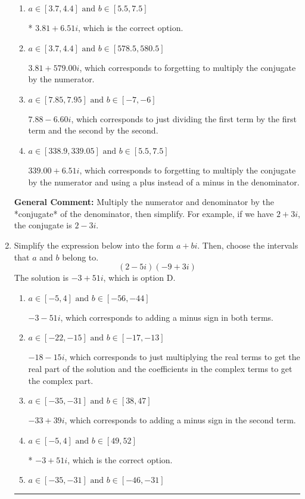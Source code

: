 \documentclass{extbook}[14pt]
\newcommand{\litem}[1]{\item #1

\rule{\textwidth}{0.4pt}}
\begin{document}
\begin{enumerate}
{\begin{enumerate}[label=\Alph*.]
 $7.52  - 0.57 i$, which corresponds to forgetting to multiply the conjugate by the numerator and not computing the conjugate correctly.
\item \( a \in [3.7, 4.4] \text{ and } b \in [5.5, 7.5] \)

* $3.81  + 6.51 i$, which is the correct option.
\item \( a \in [3.7, 4.4] \text{ and } b \in [578.5, 580.5] \)

 $3.81  + 579.00 i$, which corresponds to forgetting to multiply the conjugate by the numerator.
\item \( a \in [7.85, 7.95] \text{ and } b \in [-7, -6] \)

 $7.88  - 6.60 i$, which corresponds to just dividing the first term by the first term and the second by the second.
\item \( a \in [338.9, 339.05] \text{ and } b \in [5.5, 7.5] \)

 $339.00  + 6.51 i$, which corresponds to forgetting to multiply the conjugate by the numerator and using a plus instead of a minus in the denominator.
\end{enumerate}

\textbf{General Comment:} Multiply the numerator and denominator by the *conjugate* of the denominator, then simplify. For example, if we have $2+3i$, the conjugate is $2-3i$.
}
\litem{
Simplify the expression below into the form $a+bi$. Then, choose the intervals that $a$ and $b$ belong to.
\[ (2 - 5 i)(-9 + 3 i) \]The solution is \( -3 + 51 i \), which is option D.\begin{enumerate}[label=\Alph*.]
\item \( a \in [-5, 4] \text{ and } b \in [-56, -44] \)

 $-3 - 51 i$, which corresponds to adding a minus sign in both terms.
\item \( a \in [-22, -15] \text{ and } b \in [-17, -13] \)

 $-18 - 15 i$, which corresponds to just multiplying the real terms to get the real part of the solution and the coefficients in the complex terms to get the complex part.
\item \( a \in [-35, -31] \text{ and } b \in [38, 47] \)

 $-33 + 39 i$, which corresponds to adding a minus sign in the second term.
\item \( a \in [-5, 4] \text{ and } b \in [49, 52] \)

* $-3 + 51 i$, which is the correct option.
\item \( a \in [-35, -31] \text{ and } b \in [-46, -31] \)


\end{enumerate}}
\end{enumerate}
\end{document}
